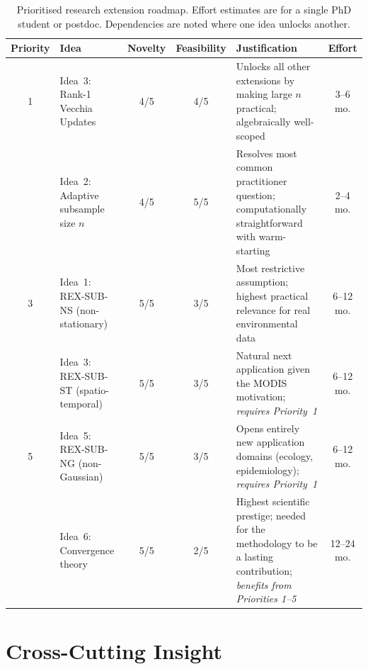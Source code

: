 \documentclass[12pt, a4paper]{article}
\begin{document}
\begin{table}[ht]
\centering
\caption{Prioritised research extension roadmap.  Effort estimates are for a
  single PhD student or postdoc.  Dependencies are noted where one idea unlocks
  another.}
\label{tab:roadmap}
\small
\setlength{\tabcolsep}{4pt}
\begin{tabular}{@{}clccp{3.8cm}c@{}}
\toprule
\textbf{Priority} & \textbf{Idea} & \textbf{Novelty} & \textbf{Feasibility}
  & \textbf{Justification} & \textbf{Effort} \\
\midrule
\rowcolor{ideabg}
1 & Idea~3: Rank-1 Vecchia Updates & 4/5 & 4/5
  & Unlocks all other extensions by making large $n$ practical;
    algebraically well-scoped
  & 3--6 mo. \\
\addlinespace[2pt]
2 & Idea~2: Adaptive subsample size $n$ & 4/5 & 5/5
  & Resolves most common practitioner question; computationally
    straightforward with warm-starting
  & 2--4 mo. \\
\addlinespace[2pt]
\rowcolor{ideabg}
3 & Idea~1: REX-SUB-NS (non-stationary) & 5/5 & 3/5
  & Most restrictive assumption; highest practical relevance for
    real environmental data
  & 6--12 mo. \\
\addlinespace[2pt]
4 & Idea~3: REX-SUB-ST (spatio-temporal) & 5/5 & 3/5
  & Natural next application given the MODIS motivation;
    \textit{requires Priority~1}
  & 6--12 mo. \\
\addlinespace[2pt]
\rowcolor{ideabg}
5 & Idea~5: REX-SUB-NG (non-Gaussian) & 5/5 & 3/5
  & Opens entirely new application domains (ecology, epidemiology);
    \textit{requires Priority~1}
  & 6--12 mo. \\
\addlinespace[2pt]
6 & Idea~6: Convergence theory & 5/5 & 2/5
  & Highest scientific prestige; needed for the methodology to be
    a lasting contribution; \textit{benefits from Priorities 1--5}
  & 12--24 mo. \\
\bottomrule
\end{tabular}
\end{table}

\section{Cross-Cutting Insight}
\end{document}
